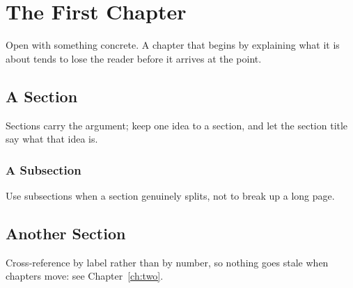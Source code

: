 \chapter{The First Chapter}
\label{ch:one}

Open with something concrete. A chapter that begins by explaining what
it is about tends to lose the reader before it arrives at the point.

\section{A Section}

Sections carry the argument; keep one idea to a section, and let the
section title say what that idea is.

\subsection{A Subsection}

Use subsections when a section genuinely splits, not to break up a long
page.

\section{Another Section}

Cross-reference by label rather than by number, so nothing goes stale
when chapters move: see Chapter~\ref{ch:two}.
